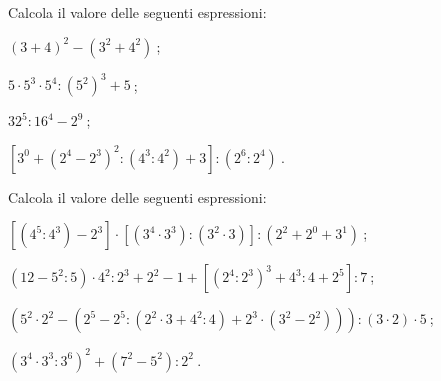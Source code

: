 \pagebreak
\begin{esercizio}[\Ast]
 Calcola il valore delle seguenti espressioni:
 \begin{enumeratea}
 \item $(3+4)^2-(3^2+4^2)~$;
 \item $5\cdot5^3\cdot5^4:(5^2)^3+5~$;
 \item $32^5:16^4-2^9~$;
 \item $[3^0+(2^4-2^3)^2:(4^3:4^2)+3 ]:(2^6:2^4)~$.
 \end{enumeratea}
\end{esercizio}


\begin{esercizio}[\Ast]
 Calcola il valore delle seguenti espressioni:
 \begin{enumeratea}
 \item $[(4^5:4^3)-2^3]\cdot[(3^4\cdot 3^3):(3^2\cdot3)]:(2^2+2^0+3^1)~$;
 \item $(12-5^2:5)\cdot4^2:2^3+2^2-1+[(2^4:2^3)^3+4^3:4+2^5]:7~$;
 \item $(5^2\cdot2^2-(2^5-2^5:(2^2\cdot 3 +4^2:4)+2^3\cdot(3^2-2^2))):(3\cdot2 )\cdot5~$;
 \item $(3^4\cdot3^3:3^6)^2+(7^2-5^2):2^2~$.
 \end{enumeratea}
\end{esercizio}


